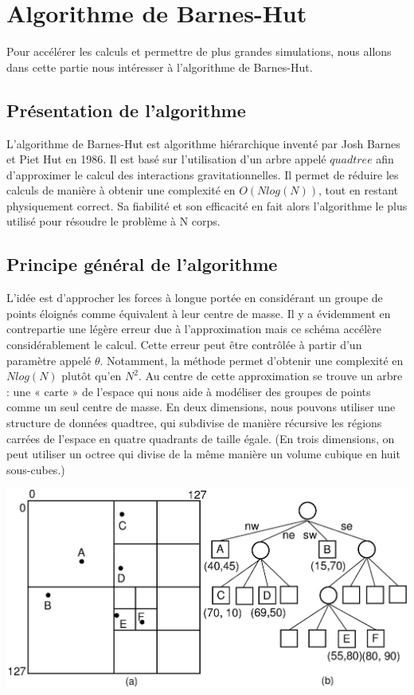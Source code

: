 \chapter{Algorithme de Barnes-Hut}

Pour accélérer les calculs et permettre de plus grandes simulations, nous allons dans cette partie nous intéresser à l’algorithme de Barnes-Hut.

\section{Présentation de l'algorithme}

L'algorithme de Barnes-Hut est algorithme hiérarchique inventé par Josh Barnes et Piet Hut en 1986. Il est basé sur l'utilisation d'un arbre appelé $quadtree$ afin d'approximer le calcul des  interactions gravitationnelles. Il permet de réduire les calculs de manière à obtenir une complexité en $O(Nlog(N))$, tout en restant physiquement correct. Sa fiabilité et son efficacité en fait alors l'algorithme le plus utilisé pour résoudre le problème à N corps.
 
\section{Principe général de l'algorithme}

L'idée est d'approcher les forces à longue portée en considérant un groupe de points éloignés comme équivalent à leur centre de masse. Il y a évidemment en contrepartie une légère erreur due à l'approximation mais ce schéma accélère considérablement le calcul. Cette erreur peut être contrôlée à partir d'un paramètre appelé $\theta$. Notamment, la méthode permet d'obtenir une complexité en $ Nlog(N)$ plutôt qu'en $N^2$.
Au centre de cette approximation se trouve un arbre : une « carte » de l'espace qui nous aide à modéliser des groupes de points comme un seul centre de masse. En deux dimensions, nous pouvons utiliser une structure de données quadtree, qui subdivise de manière récursive les régions carrées de l'espace en quatre quadrants de taille égale. (En trois dimensions, on peut utiliser un octree qui divise de la même manière un volume cubique en huit sous-cubes.)


\begin{center}
\includegraphics[scale=0.2]{./images/quadtree.png}
\captionsetup{hypcap=false}
\label{fig6}
\end{center}


